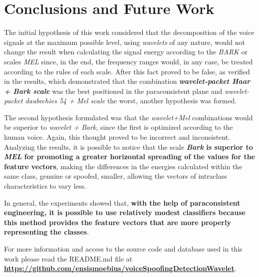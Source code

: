 \section{Conclusions and Future Work}
\label{sec:conclusions}
	\par The initial hypothesis of this work considered that the decomposition of the voice signals at the maximum possible level, using \textit{wavelets} of any nature, would not change the result when calculating the signal energy according to the \textit{BARK} or scales \textit{MEL} since, in the end, the frequency ranges would, in any case, be treated according to the rules of each scale. After this fact proved to be false, as verified in the results, which demonstrated that the combination \textbf{\textit{wavelet-packet Haar + Bark scale}} was the best positioned in the paraconsistent plane and \textit{wavelet-packet daubechies 54 + Mel scale} the worst, another hypothesis was formed.\\
	
	\par The second hypothesis formulated was that the \textit{wavelet+Mel} combinations would be superior to \textit{wavelet + Bark}, since the first is optimized according to the human voice. Again, this thought proved to be incorrect and inconsistent. Analyzing the results, it is possible to notice that the scale \textbf{\textit{Bark} is superior to \textit{MEL} for promoting a greater horizontal spreading of the values for the feature vectors}, making the differences in the energies calculated within the same class, genuine or spoofed, smaller, allowing the vectors of intraclass characteristics to vary less.\\
	
	\par In general, the experiments showed that, \textbf{with the help of  paraconsistent engineering, it is possible to use relatively modest classifiers because this method provides the feature vectors that are more properly representing the classes}.\\
	
	\par For more information and access to the source code and database used in this work please read the README.md file at \href{https://github.com/ensismoebius/voiceSpoofingDetectionWavelet}{\textbf{https://github.com/ensismoebius/voiceSpoofingDetectionWavelet}}.
	
